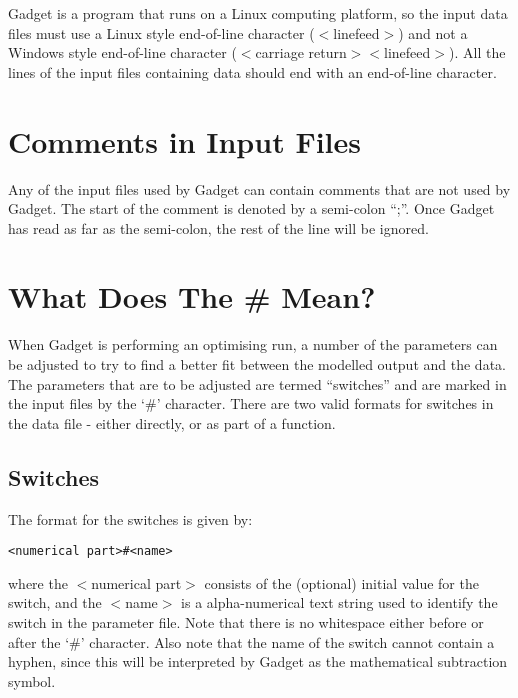\documentclass[]{book}
\begin{document}
Gadget is a program that runs on a Linux computing platform, so the
input data files must use a Linux style end-of-line character
(\(<\)linefeed\(>\)) and not a Windows style end-of-line character
(\(<\)carriage return\(><\)linefeed\(>\)). All the lines of the input files
containing data should end with an end-of-line character.

\hypertarget{sec:comments}{%
\section{Comments in Input Files}\label{sec:comments}}

Any of the input files used by Gadget can contain comments that are not
used by Gadget. The start of the comment is denoted by a semi-colon ``;''.
Once Gadget has read as far as the semi-colon, the rest of the line will
be ignored.

\hypertarget{sec:whatdoeshash}{%
\section{What Does The \# Mean?}\label{sec:whatdoeshash}}

When Gadget is performing an optimising run, a number of the parameters
can be adjusted to try to find a better fit between the modelled output
and the data. The parameters that are to be adjusted are termed
``switches'' and are marked in the input files by the `\#' character.
There are two valid formats for switches in the data file - either
directly, or as part of a function.

\hypertarget{switches}{%
\subsection{Switches}\label{switches}}

The format for the switches is given by:

\begin{verbatim}
<numerical part>#<name>
\end{verbatim}

where the \(<\)numerical part\(>\) consists of the (optional) initial value
for the switch, and the \(<\)name\(>\) is a alpha-numerical text string used
to identify the switch in the parameter file. Note that there is no
whitespace either before or after the `\#' character. Also note that the
name of the switch cannot contain a hyphen, since this will be
interpreted by Gadget as the mathematical subtraction symbol.
\end{document}

